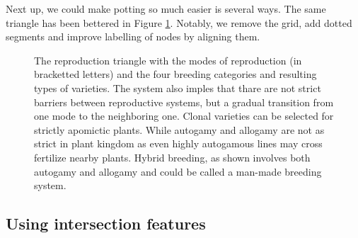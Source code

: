 \documentclass[nofonts,]{tufte-handout}
\begin{document}


Next up, we could make potting so much easier is several ways. The same
triangle has been bettered in Figure \ref{fig:triangle-of-breeding}.
Notably, we remove the grid, add dotted segments and improve labelling
of nodes by aligning them.

\vspace{1cm}

\begin{figure}
\centering
{}
\caption{The reproduction triangle with the modes of reproduction (in bracketted letters) and the four breeding categories and resulting types of varieties. The system also imples that thare are not strict barriers between reproductive systems, but a gradual transition from one mode to the neighboring one. Clonal varieties can be selected for strictly apomictic plants. While autogamy and allogamy are not as strict in plant kingdom as even highly autogamous lines may cross fertilize nearby plants. Hybrid breeding, as shown involves both autogamy and allogamy and could be called a man-made breeding system.} \label{fig:triangle-of-breeding}
\end{figure}

\hypertarget{using-intersection-features}{%
\subsection{Using intersection
features}\label{using-intersection-features}}
\end{document}
